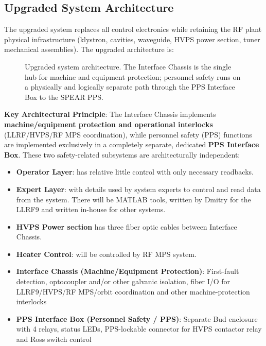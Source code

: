 {\subsection{Upgraded System Architecture}\label{upgraded-system-architecture}

The upgraded system replaces all control electronics while retaining the RF plant physical infrastructure (klystron, cavities, waveguide, HVPS power section, tuner mechanical assemblies). The upgraded architecture is:

\begin{figure}[p]
\centering
\begin{fitpicture}\end{fitpicture}
\caption{Upgraded system architecture.  The Interface Chassis is the single hub for machine and equipment protection; personnel safety runs on a physically and logically separate path through the PPS Interface Box to the SPEAR PPS.}\label{fig:upgrade-architecture}
\end{figure}
\textbf{Key Architectural Principle}: The Interface Chassis implements \textbf{machine/equipment protection and operational interlocks} (LLRF/HVPS/RF MPS coordination), while personnel safety (PPS) functions are implemented exclusively in a completely separate, dedicated \textbf{PPS Interface Box}. These two safety-related subsystems are architecturally independent:

\begin{itemize}
\tightlist
\item
  \textbf{Operator Layer}: has relative little control with only necessary readbacks.
\item
  \textbf{Expert Layer}: with details used by system experts to control and read data from the system. There will be MATLAB tools, written by Dmitry for the LLRF9 and written in-house for other systems.
\item
  \textbf{HVPS Power section} has three fiber optic cables between Interface Chassis.
\item
  \textbf{Heater Control}: will be controlled by RF MPS system.
\item
  \textbf{Interface Chassis (Machine/Equipment Protection)}: First-fault detection, optocoupler and/or other galvanic isolation, fiber I/O for LLRF9/HVPS/RF MPS/orbit coordination and other machine-protection interlocks
\item
  \textbf{PPS Interface Box (Personnel Safety / PPS)}: Separate Bud enclosure with 4 relays, status LEDs, PPS-lockable connector for HVPS contactor relay and Ross switch control
\end{itemize}

}
